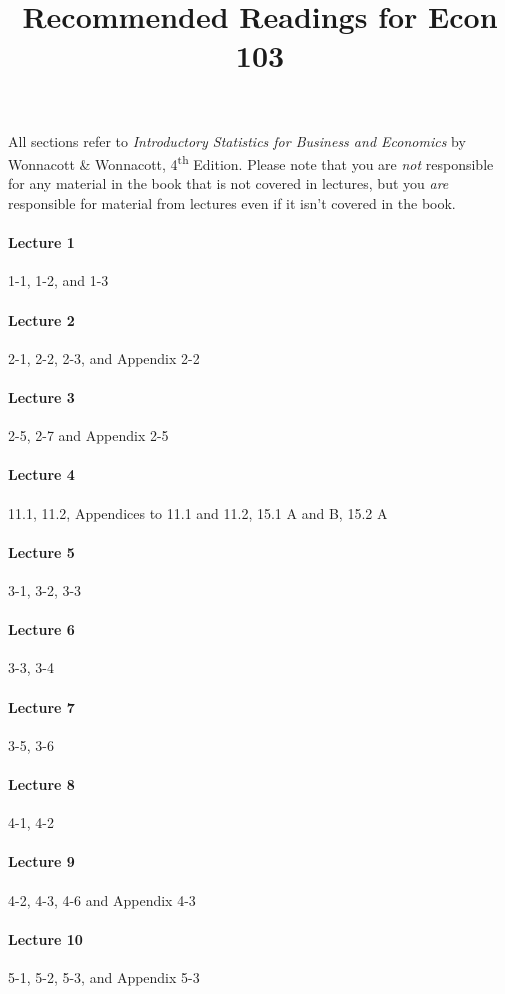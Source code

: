 \documentclass[12pt]{article}
\title{Recommended Readings for Econ 103}
\author{}
\begin{document}
\maketitle

\noindent All sections refer to \emph{Introductory Statistics for Business and Economics} by Wonnacott \& Wonnacott, 4\textsuperscript{th} Edition.
Please note that you are \emph{not} responsible for any material in the book that is not covered in lectures, but you \emph{are} responsible for material from lectures even if it isn't covered in the book.

\paragraph{Lecture 1} 1-1, 1-2, and 1-3
\paragraph{Lecture 2} 2-1, 2-2, 2-3, and Appendix 2-2
\paragraph{Lecture 3} 2-5, 2-7 and Appendix 2-5
\paragraph{Lecture 4} 11.1, 11.2, Appendices to 11.1 and 11.2, 15.1 A and B, 15.2 A
\paragraph{Lecture 5} 3-1, 3-2, 3-3
\paragraph{Lecture 6} 3-3, 3-4
\paragraph{Lecture 7} 3-5, 3-6 
\paragraph{Lecture 8} 4-1, 4-2
\paragraph{Lecture 9} 4-2, 4-3, 4-6 and Appendix 4-3
\paragraph{Lecture 10} 5-1, 5-2, 5-3, and Appendix 5-3
\end{document}
